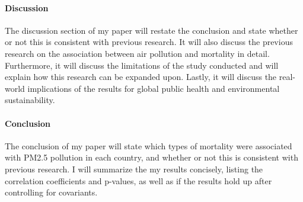 \documentclass[12pt]{article}\usepackage[]{graphicx}\usepackage[]{xcolor}
\begin{document}
\paragraph{Discussion}
The discussion section of my paper will restate the conclusion and state whether or not this is consistent with previous research. It will also discuss the previous research on the association between air pollution and mortality in detail. Furthermore, it will discuss the limitations of the study conducted and will explain how this research can be expanded upon. Lastly, it will discuss the real-world implications of the results for global public health and environmental sustainability.

\paragraph{Conclusion}
The conclusion of my paper will state which types of mortality were associated with PM2.5 pollution in each country, and whether or not this is consistent with previous research. I will summarize the my results concisely, listing the correlation coefficients and p-values, as well as if the results hold up after controlling for covariants.


\end{document}
